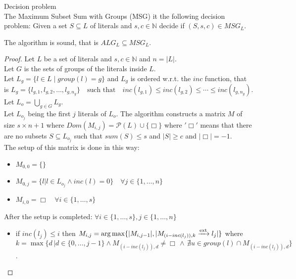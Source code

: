 \begin{definition}{Decision problem}\\
    The Maximum Subset Sum with Groups (MSG) it the following decision problem:
    Given a set $S \subseteq L$ of literals and  $s,c \in \mathbb{N}$ decide
    if $(S,s,c) \in MSG_L$.

\end{definition}


\begin{theorem}
    The algorithm is sound, that is $ALG_L \subseteq MSG_L$.
\end{theorem}

\begin{proof}
    Let $L$ be a set of literals and $s,c \in \mathbb{N}$ and $n = |L|$.\\
    Let $G$ is the sets of groups of the literals inside $L$.\\
    Let $L_g = \{ l \in L \mid group(l) = g \}$ and $L_g$ is ordered w.r.t. the $inc$ function,
    that is $L_g = \{ l_{g,1}, l_{g,2}, \ldots, l_{g,n_g} \} \quad \text{such that} 
    \quad inc(l_{g,1}) \leq inc(l_{g,2}) \leq \cdots \leq inc(l_{g,n_g}).$\\
    Let $L_o = \bigcup_{g \in G} L_g$.\\
    Let $L_{o_j}$ being the first $j$ literals of $L_o$.
    The algorithm constructs a matrix $M$ of size $s \times n + 1$ where 
    $Dom(M_{i,j}) = \mathcal{P}(L) \cup \{\Box\} $ where $'\Box'$ means that there are no subsets $S \subseteq L_{o_{j}}$
    such that $sum(S) \le s$ and $|S| \ge c$ and $|\Box| = -1$.\\
    The setup of this matrix is done in this way:
    \begin{itemize}
        \item $M_{0,0} = \{\}$ 
        \item $M_{0,j} = \{ l | l \in L_{o_{j}} \land inc(l) = 0\} \quad \forall j \in \{1, \hdots , n\}$ 
        \item $M_{i,0} = \Box \quad \forall i \in \{1, \hdots , s\}$
    \end{itemize}
    After the setup is completed: $\forall i \in \{1, \hdots , s\}, j \in \{1, \hdots , n\}$
    \begin{itemize}
        \item if $inc(l_j) \le i$ then $M_{i,j} = \arg \max \{|M_{i,j-1}|, |M_{(i-inc(l_j)),k} \xrightarrow{\text{ext}} l_j|\}$
            where $k = \max \{d \, | d \in \{0, \hdots, j-1\} \land M_{(i-inc(l_j)),d} \ne \Box 
            \, \land \, \nexists u \in group(l) \cap M_{(i-inc(l_j)),d} \}$.

\end{itemize}
\end{proof}
